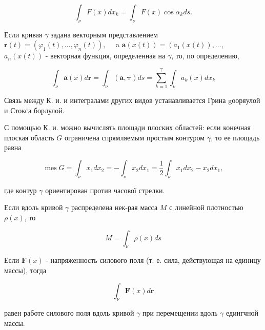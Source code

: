 \documentclass[10pt]{article}
\begin{document}
\[

\int_{\nu} F(x) d x_{k}=\int_{\nu} F(x) \cos \alpha_{k} d s .

\]



Если кривая $\gamma$ задана векторным представлением $\boldsymbol{r}(t)=\left(\varphi_{1}(t), \ldots, \varphi_{n}(t)\right), \quad$ a $\boldsymbol{a}(x(t))=\left(a_{1}(x(t)), \ldots\right.$, $a_{n}(x(t))$ - векторная функция, определенная на $\gamma$, то, по определению,



\[

\int_{\nu} \boldsymbol{a}(x) d \boldsymbol{r}=\int_{\nu}(\boldsymbol{a}, \boldsymbol{\tau}) d s=\sum_{k=1}^{\boldsymbol{\top}} \int_{\nu} a_{k}(x) d x_{k}

\]



Связь между К. и. и интегралами других видов устанавливается Грина gооряулой и Стокса борлулой.



С помощью К. и. можно вычислять площади плоских областей: если конечная плоская область $G$ ограничена спрямляемым простым контуром $\gamma$, то ее площадь равна



\[

\operatorname{mes} G=\int_{\nu} x_{1} d x_{2}=-\int_{\nu} x_{2} d x_{1}=\frac{1}{2} \int_{\nu} x_{1} d x_{2}-x_{2} d x_{1},

\]



где контур $\gamma$ ориентирован против часової стрелки.



Если вдоль кривой $\gamma$ распределена нек-рая масса $M$ с линейной плотностью $\rho(x)$, то



\[

M=\int_{\nu} \rho(x) d s

\]



Если $\boldsymbol{F}(x)$ - напряженность силового поля (т. е. сила, действующая на единицу массы), тогда



\[

\int_{\nu} \boldsymbol{F}(x) d \boldsymbol{r}

\]



равен работе силового поля вдоль кривой $\gamma$ при перемещении вдоль $\gamma$ едингчной массы.
\end{document}
